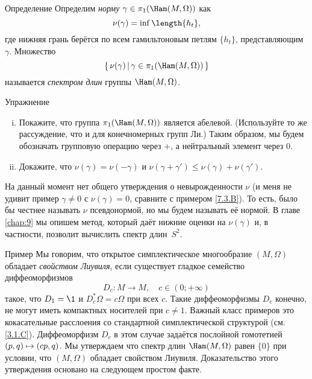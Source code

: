 \begin{ex}{Определение}\label{7.3.A}
Определим {}\emph{норму} $\gamma \in \pi_1 (\Ham (M, \Omega))$ как \index[symb]{$\nu(\gamma)$}
\[\nu(\gamma)=\inf\length\{h_t\},\]
где нижняя грань берётся по всем гамильтоновым петлям $\{h_t\}$, представляющим $\gamma$.
Множество 
\[\set{\nu (\gamma)}{\gamma \in \pi_1 (\Ham (M, \Omega))}\]
называется \emph{спектром длин} группы $\Ham (M, \Omega)$.
\end{ex}

\begin{ex*}{Упражнение}

\begin{enumerate}[(i)]
 \item Покажите, что группа $\pi_1 (\Ham (M, \Omega))$ является абелевой. (Используйте то же рассуждение, что и для конечномерных групп Ли.)
Таким образом, мы будем обозначать групповую операцию через $+$, а нейтральный элемент через $0$.
 \item Докажите, что $\nu (\gamma) = \nu (-\gamma)$ и $\nu (\gamma + \gamma') \le \nu (\gamma) + \nu (\gamma')$.
\end{enumerate}

\end{ex*}

На данный момент нет общего утверждения о невырожденности $\nu$ (и
меня не удивит пример $\gamma \ne 0$ с $\nu (\gamma) = 0$, сравните с
примером \ref{7.3.B}). 
То есть, было бы честнее называть $\nu$ псевдонормой, но мы будем
называть её нормой. 
В главе \ref{chap:9} мы опишем метод, который даёт нижние оценки
на $\nu (\gamma)$ и, в частности, позволит вычислить спектр
длин~$S^2$. 

\begin{ex}{Пример}\label{7.3.B}
Мы говорим, что открытое симплектическое многообразие $(M, \Omega)$
обладает \emph{свойством Лиувиля}, если
существует гладкое семейство диффеоморфизмов 
\[D_c: M \to M,\quad c \in (0; + \infty)\]
такое, что $D_1 = \1$ и $D_c^\ast \Omega = c\Omega$ при всех $c$.
Такие диффеоморфизмы $D_c$ конечно, не могут иметь компактных
носителей при $c \ne 1$. 
Важный класс примеров это кокасательные расслоения со стандартной
симплектической структурой (см. \ref{3.1.C}).
Диффеоморфизм $D_c$ в этом случае задаётся послойной гомотетией $(p,
q) \z\mapsto (cp, q)$. 
Мы утверждаем что спектр длин $\Ham (M, \Omega)$ равен $\{0\}$ при
условии, что $(M, \Omega)$ 
обладает свойством Лиувиля.
Доказательство этого утверждения основано на следующем простом факте.
\end{ex}

